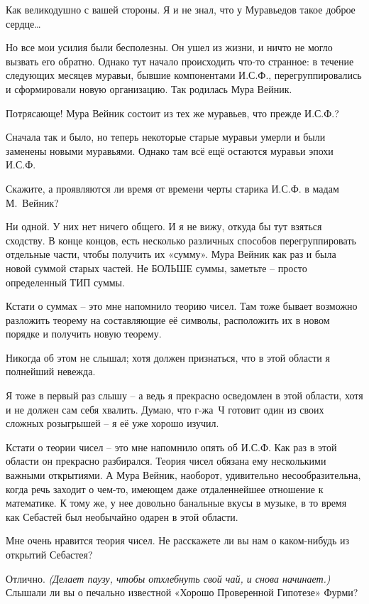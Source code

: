 \documentclass[../main.tex]{subfiles}
\begin{document}
\begin{dialogue}
 Как великодушно с вашей стороны. Я и не знал, что у Муравьедов такое доброе сердце\ldots{}

 Но все мои усилия были бесполезны. Он ушел из жизни, и ничто не могло вызвать его обратно. Однако тут начало происходить что-то странное: в течение следующих месяцев муравьи, бывшие компонентами И.С.Ф., перегруппировались и сформировали новую организацию. Так родилась Мура Вейник.

 Потрясающе! Мура Вейник состоит из тех же муравьев, что прежде И.С.Ф.?

 Сначала так и было, но теперь некоторые старые муравьи умерли и были заменены новыми муравьями. Однако там всё ещё остаются муравьи эпохи И.С.Ф.

 Скажите, а проявляются ли время от времени черты старика И.С.Ф. в мадам М.~Вейник?

 Ни одной. У них нет ничего общего. И я не вижу, откуда бы тут взяться сходству. В конце концов, есть несколько различных способов перегруппировать отдельные части, чтобы получить их «сумму». Мура Вейник как раз и была новой суммой старых частей. Не БОЛЬШЕ суммы, заметьте \--- просто определенный ТИП суммы.

 Кстати о суммах \--- это мне напомнило теорию чисел. Там тоже бывает возможно разложить теорему на составляющие её символы, расположить их в новом порядке и получить новую теорему.

 Никогда об этом не слышал; хотя должен признаться, что в этой области я полнейший невежда.

 Я тоже в первый раз слышу \--- а ведь я прекрасно осведомлен в этой области, хотя и не должен сам себя хвалить. Думаю, что г-жа~Ч готовит один из своих сложных розыгрышей \--- я её уже хорошо изучил.

 Кстати о теории чисел \--- это мне напомнило опять об И.С.Ф\@. Как раз в этой области он прекрасно разбирался. Теория чисел обязана ему несколькими важными открытиями. А Мура Вейник, наоборот, удивительно несообразительна, когда речь заходит о чем-то, имеющем даже отдаленнейшее отношение к математике. К тому же, у нее довольно банальные вкусы в музыке, в то время как Себастей был необычайно одарен в этой области.

 Мне очень нравится теория чисел. Не расскажете ли вы нам о каком-нибудь из открытий Себастея?

 Отлично. \emph{(Делает паузу, чтобы отхлебнуть свой чай, и снова начинает.)} Слышали ли вы о печально известной «Хорошо Проверенной Гипотезе» Фурми?


\end{dialogue}
\end{document}
